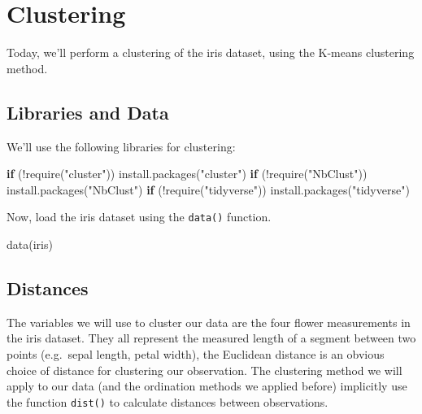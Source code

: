 \documentclass[
]{book}
\newenvironment{Shaded}{\begin{snugshade}}{\end{snugshade}}
\newcommand{\ControlFlowTok}[1]{\textcolor[rgb]{0.13,0.29,0.53}{\textbf{#1}}}
\newcommand{\FunctionTok}[1]{\textcolor[rgb]{0.00,0.00,0.00}{#1}}
\newcommand{\NormalTok}[1]{#1}
\newcommand{\SpecialCharTok}[1]{\textcolor[rgb]{0.00,0.00,0.00}{#1}}
\newcommand{\StringTok}[1]{\textcolor[rgb]{0.31,0.60,0.02}{#1}}
\begin{document}
\hypertarget{clustering}{%
\chapter{Clustering}\label{clustering}}

Today, we'll perform a clustering of the iris dataset, using the K-means clustering method.

\hypertarget{libraries-and-data-1}{%
\section{Libraries and Data}\label{libraries-and-data-1}}

We'll use the following libraries for clustering:

\begin{Shaded}
\begin{Highlighting}[]
\ControlFlowTok{if}\NormalTok{ (}\SpecialCharTok{!}\FunctionTok{require}\NormalTok{(}\StringTok{"cluster"}\NormalTok{)) }\FunctionTok{install.packages}\NormalTok{(}\StringTok{"cluster"}\NormalTok{)}
\ControlFlowTok{if}\NormalTok{ (}\SpecialCharTok{!}\FunctionTok{require}\NormalTok{(}\StringTok{"NbClust"}\NormalTok{)) }\FunctionTok{install.packages}\NormalTok{(}\StringTok{"NbClust"}\NormalTok{)}
\ControlFlowTok{if}\NormalTok{ (}\SpecialCharTok{!}\FunctionTok{require}\NormalTok{(}\StringTok{"tidyverse"}\NormalTok{)) }\FunctionTok{install.packages}\NormalTok{(}\StringTok{"tidyverse"}\NormalTok{)}
\end{Highlighting}
\end{Shaded}

Now, load the iris dataset using the \texttt{data()} function.

\begin{Shaded}
\begin{Highlighting}[]
\FunctionTok{data}\NormalTok{(iris)}
\end{Highlighting}
\end{Shaded}

\hypertarget{distances}{%
\section{Distances}\label{distances}}

The variables we will use to cluster our data are the four flower measurements in the iris dataset. They all represent the measured length of a segment between two points (e.g.~sepal length, petal width), the Euclidean distance is an obvious choice of distance for clustering our observation. The clustering method we will apply to our data (and the ordination methods we applied before) implicitly use the function \texttt{dist()} to calculate distances between observations.
\end{document}
